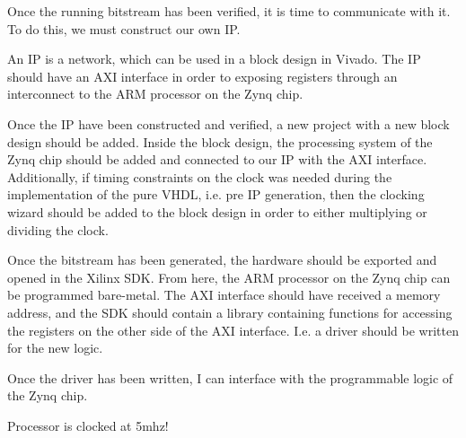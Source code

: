 Once the running bitstream has been verified, it is time to communicate with
it. To do this, we must construct our own IP.

An IP is a network, which can be used in a block design in Vivado. The IP
should have an AXI interface in order to exposing registers through an
interconnect to the ARM processor on the Zynq chip.

Once the IP have been constructed and verified, a new project with a new block
design should be added. Inside the block design, the processing system of the
Zynq chip should be added and connected to our IP with the AXI interface.
Additionally, if timing constraints on the clock was needed during the
implementation of the pure VHDL, i.e. pre IP generation, then the clocking
wizard should be added to the block design in order to either multiplying or
dividing the clock.

Once the bitstream has been generated, the hardware should be exported and
opened in the Xilinx SDK. From here, the ARM processor on the Zynq chip can be
programmed bare-metal. The AXI interface should have received a memory address,
and the SDK should contain a library containing functions for accessing the
registers on the other side of the AXI interface. I.e. a driver should be
written for the new logic.

Once the driver has been written, I can interface with the programmable logic
of the Zynq chip.

Processor is clocked at 5mhz!
